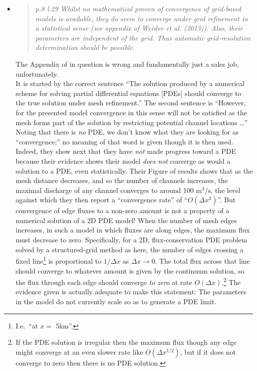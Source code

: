 \documentclass[11pt,reqno]{amsart}
\newcommand{\reply}[2]{
\medskip\medskip
\item  \begin{quote}
\emph{#1}
\end{quote}

\medskip
\noindent #2}
\begin{document}
\begin{itemize}
\reply{p.8 l.29 Whilst no mathematical proven of convergence of grid-based models is available,  they do seem to converge under grid refinement in a statistical sense (see appendix of Werder et al. (2013)).  Also, their parameters are independent of the grid.  Thus automatic grid-resolution determination should be possible.}
{The Appendix of \cite{Werderetal2013} in question is wrong and fundamentally just a sales job, unfortunately. \\
\indent It is started by the correct sentence ``The solution produced by a numerical scheme for solving partial differential equations [PDEs] should converge to the true solution under mesh refinement.''  The second sentence is ``However, for the presented model convergence in this sense will not be satisfied as the mesh forms part of the solution by restricting potential channel locations \dots''  Noting that there is \emph{no} PDE, we don't know what they are looking for as ``convergence;'' no meaning of that word is given though it is then used.  \\
\indent Indeed, they show next that they have \emph{not} made progress toward a PDE because their evidence shows their model \emph{does not} converge as would a solution to a PDE, even statistically.  Their Figure of results shows that as the mesh distance decreases, and so the number of channels increases, the maximal discharge of any channel converges to around 100 $\text{m}^3/\text{s}$, the level against which they then report a ``convergence rate'' of ``$O(\Delta x^2)$''.  But convergence of edge fluxes to a non-zero amount is not a property of a numerical solution of a 2D PDE model! When the number of mesh edges increases, in such a model in which fluxes are along edges, the maximum flux must decrease to zero.  Specifically, for a 2D, flux-conservation PDE problem solved by a structured-grid method as here, the number of edges crossing a fixed line\footnote{I.e.~``at $x=$ 5km''.} is proportional to $1/\Delta x$ as $\Delta x\to 0$.  The total flux across that line should converge to whatever amount is given by the continuum solution, so the flux through each edge should converge \emph{to zero} at rate $O(\Delta x)$.\footnote{If the PDE solution is irregular then the maximum flux though any edge might converge at an even slower rate like $O(\Delta x^{1/2})$, but if it does not converge to zero then there is no PDE solution.}  The evidence given is actually adequate to make this statement: The parameters in the model do not currently scale so as to generate a PDE limit. \\
}
\end{itemize}
\end{document}

